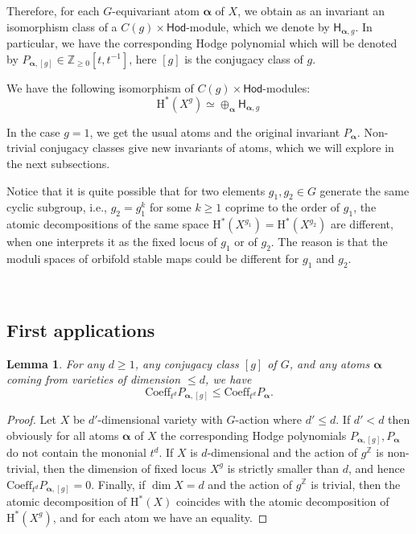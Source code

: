 \documentclass[12pt,a4paper]{amsart}
\newtheorem{lemma}[theorem]{Lemma}
\theoremstyle{definition}
\theoremstyle{remark}
\newcommand{\Z}{\mathbb{Z}}
\newcommand{\rH}{\mathrm{H}}
\begin{document}
 Therefore, for each $G$-equivariant atom $\boldsymbol\alpha$ of $X$, we obtain as an invariant an isomorphism class of a $C(g)\times \mathsf{Hod}$-module, which we denote by $\mathsf H_{\boldsymbol\alpha,g}$. In particular, we have the corresponding Hodge polynomial which will be denoted by $P_{\boldsymbol{\alpha},[g]}\in\Z_{\ge 0}[t,t^{-1}]$, here $[g]$ is the conjugacy class of $g$.

 We have the following isomorphism of $C(g)\times \mathsf{Hod}$-modules:
 $$\rH^\ast(X^g)\simeq \oplus_{\boldsymbol\alpha}  \mathsf H_{\boldsymbol\alpha,g}\,$$


  In the case $g=1$, we get the usual atoms and the original invariant $P_{\boldsymbol{\alpha}}$. Non-trivial conjugacy classes give new invariants of atoms, which we will explore in the next subsections.
  
 Notice that it is quite possible that for two elements $g_1,g_2\in G$ generate the same cyclic subgroup, i.e., $g_2=g_1^k$ for some $k\ge 1$ coprime to the order of $g_1$, the atomic decompositions of the same space $\rH^\ast(X^{g_1})=\rH^\ast(X^{g_2})$ are different, when one interprets it as the fixed locus of $g_1$ or of $g_2$. The reason is that the moduli spaces of orbifold stable maps could be different for $g_1$ and $g_2$.

\ 

 \subsection{First applications}

 \begin{lemma}\label{lem:coefficient}
    For any $d\ge 1$, any conjugacy class $[g]$ of $G$, and any atoms $\boldsymbol\alpha$ coming from varieties of dimension $\le d$, we have 
    $$\mathrm{Coeff}_{t^d}P_{\boldsymbol{\alpha},[g]}\le \mathrm{Coeff}_{t^d}P_{\boldsymbol{\alpha}}.$$
\end{lemma}
\begin{proof}
    Let $X$ be $d'$-dimensional variety with $G$-action where $d'\le d$. If $d'<d$ then obviously for all atoms $\boldsymbol{\alpha}$ of $X$ the corresponding Hodge polynomials $P_{\boldsymbol{\alpha},[g]},P_{\boldsymbol{\alpha}}$ do not contain the mononial $t^d$. 
     If $X$ is $d$-dimensional and the action of $g^\Z$ is non-trivial, then 
      the dimension of fixed locus $X^g$ is strictly smaller than $d$, and hence  $\mathrm{Coeff}_{t^d}P_{\boldsymbol{\alpha},[g]}=0$.
       Finally, if $\dim X=d$ and the action of $g^
       \Z$ is trivial, then the atomic decomposition of $\mathrm{H}^{\ast}(X)$ coincides with the atomic decomposition of $\mathrm{H}^{\ast}(X^g)$, and for each atom we have an equality. \end{proof}
\end{document}

